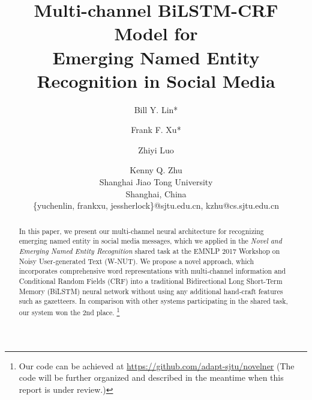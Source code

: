 \documentclass[11pt,letterpaper]{article}
\title{Multi-channel BiLSTM-CRF Model for\\  Emerging Named Entity Recognition in Social Media  }
\author{Bill Y. Lin* \and Frank F. Xu* \and Zhiyi Luo \and Kenny Q. Zhu \\
	Shanghai Jiao Tong University \\ Shanghai, China\\ \{yuchenlin, frankxu, jessherlock\}@sjtu.edu.cn, kzhu@cs.sjtu.edu.cn}
\begin{document}
\maketitle
\begin{abstract}
In this paper, we present our multi-channel neural architecture for recognizing emerging named entity in social media messages,
which we applied in the \textit{Novel and Emerging Named Entity Recognition} shared task 
at the EMNLP
2017 Workshop on Noisy User-generated Text (W-NUT). 
We propose a novel approach, which incorporates comprehensive word representations with multi-channel information and Conditional Random Fields (CRF) into a traditional Bidirectional Long Short-Term Memory
(BiLSTM) neural network
without using any additional hand-craft features such as gazetteers. 
In comparison with other systems participating in the shared task, our system won the 2nd place.
\footnote{Our code can be achieved at \url{https://github.com/adapt-sjtu/novelner}  (The code will be further organized and described in the meantime when this report is under review.)}
\end{abstract}









\end{document}
